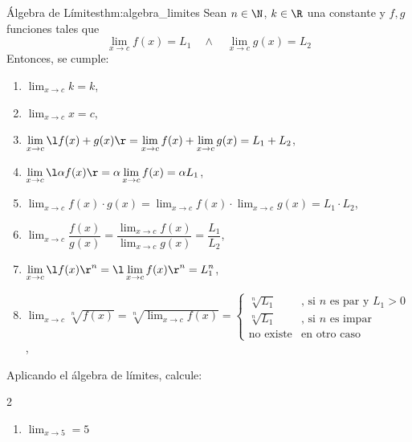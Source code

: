 \begin{theorem}{Álgebra de Límites}{thm:algebra_limites}
  Sean $n \in \N$, $k \in \R$ una constante y $f,g$ funciones tales que
  \[ \lim_{x \to c}{f(x)} = L_1 \quad \wedge \quad \lim_{x \to c}{g(x)} = L_2 \]
  Entonces, se cumple:
  \begin{enumerate}
    \item $\displaystyle{\lim_{x \to c}{k} = k}$,
    \item $\displaystyle{\lim_{x \to c}{x} = c}$,
    \item $\displaystyle{\lim_{x \to c}{\l f(x) + g(x) \r} = \lim_{x \to c}{f(x)} + \lim_{x \to c}{g(x)} = L_1 + L_2  }$,
    \item $\displaystyle{\lim_{x \to c}{\l \alpha f(x) \r} = \alpha \lim_{x \to c}{f(x)} = \alpha L_1 }$,
    \item $\displaystyle{\lim_{x \to c}{f(x) \cdot g(x)} = \lim_{x \to c}{f(x)} \cdot \lim_{x \to c}{g(x)} = L_1 \cdot L_2 }$,
    \item $\displaystyle{\lim_{x \to c}{\dfrac{f(x)}{g(x)}} = \dfrac{\displaystyle \lim_{x \to c}{f(x)}}{\displaystyle \lim_{x \to c}{g(x)}} = \dfrac{L_1}{L_2} }$,
    \item $\displaystyle{\lim_{x \to c}{\l f(x) \r^n} = \l \lim_{x \to c}{f(x)} \r^n = L_1 ^n}$,
    \item $\displaystyle{\lim_{x \to c}{\sqrt[n]{f(x)}} = \sqrt[n]{\lim_{x \to c}{f(x)}} = \begin{cases} \sqrt[n]{L_1} & \text{, si } n \text{ es par y } L_1>0 \\ \sqrt[n]{L_1} & \text{, si } n \text{ es impar} \\ \text{no existe} & \text{en otro caso} \end{cases} }$,
  \end{enumerate}
\end{theorem}

\begin{example}{}{}
  Aplicando el álgebra de límites, calcule:
  \begin{multicols}{2}
    \begin{enumerate}
      \item $\displaystyle{ \lim_{x \to 5 } = 5 }$
    \end{enumerate}
  \end{multicols}
\end{example}


